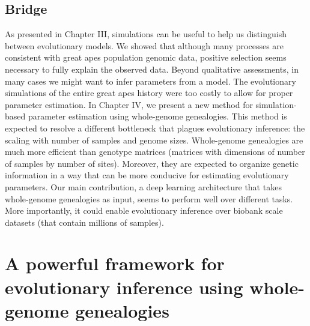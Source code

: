 \section{Bridge}
As presented in Chapter III, simulations can be useful to help us distinguish between evolutionary models.
We showed that although many processes are consistent with great apes population genomic data,
positive selection seems necessary to fully explain the observed data.
Beyond qualitative assessments, in many cases we might want to infer parameters from a model.
The evolutionary simulations of the entire great apes history were too costly to allow for proper parameter estimation.
In Chapter IV, we present a new method for simulation-based parameter estimation using whole-genome genealogies.
This method is expected to resolve a different bottleneck that plagues evolutionary inference: the scaling with number of samples and genome sizes.
Whole-genome genealogies are much more efficient than genotype matrices (matrices with dimensions of number of samples by number of sites).
Moreover, they are expected to organize genetic information in a way that can be more conducive for estimating evolutionary parameters.
Our main contribution, a deep learning architecture that takes whole-genome genealogies as input, seems to perform well over different tasks.
More importantly, it could enable evolutionary inference over biobank scale datasets (that contain millions of samples).

\chapter{A powerful framework for evolutionary inference using whole-genome genealogies} \label{chapter:tsnn}








